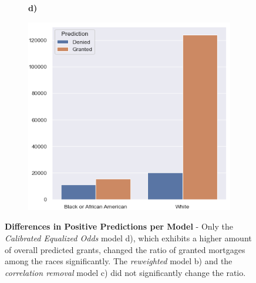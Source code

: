 \begin{figure}[!htbp]
\begin{minipage}[b]{0.5\textwidth}
\begin{subfigure}[t]{0.9\textwidth}
        \end{subfigure}
    \end{minipage}%
    \begin{minipage}[b]{0.5\textwidth}
        \centering
        \begin{subfigure}[t]{0.06\textwidth}
            \textbf{d)}
        \end{subfigure}
        \begin{subfigure}[t]{0.9\textwidth}
            \includegraphics[width=\linewidth, valign=t]{images/loan_grants_by_protected_attributes/calibrated_eqodds.png}
        \end{subfigure}
    \end{minipage}%
    \caption[Differences in Positive Predictions per Model]{\textbf{Differences in Positive Predictions per Model} - Only the \textit{Calibrated Equalized Odds} model d), which exhibits a higher amount of overall predicted grants, changed the ratio of granted mortgages among the races significantly.
    The \textit{reweighted} model b) and the \textit{correlation removal} model c) did not significantly change the ratio.}
    \label{fig:Bar_Grant_per_Race}

\end{figure}

